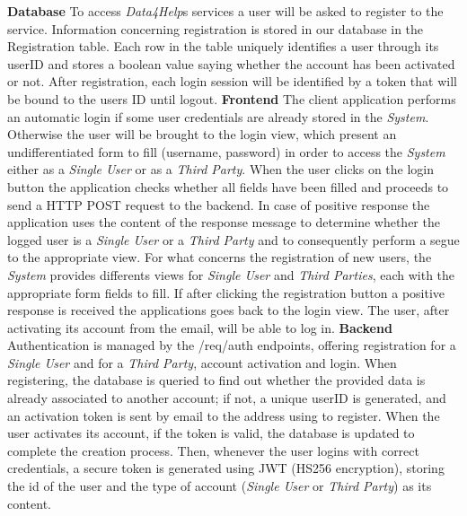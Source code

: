 \documentclass[titlepage]{article}
\begin{document}
	{\bf Database} \newline
	To access {\it Data4Help}\textsc{}s services a user will be asked to register to the service. Information concerning registration is stored in our database in the Registration table. Each row in the table uniquely identifies a user through its userID and stores a boolean value saying whether the account has been activated or not. After registration, each login session will be identified by a token that will be bound to the user\textsc{}s ID until logout.
	\newline
	\newline
	\noindent
	{\bf Frontend} \newline
	The client application performs an automatic login if some user credentials are already stored in the {\it System}. Otherwise the user will be brought to the login view, which present an undifferentiated form to fill (username, password) in order to access the {\it System} either as a {\it Single User} or as a {\it Third Party}. When the user clicks on the login button the application checks whether all fields have been filled and proceeds to send a HTTP POST request to the backend. In case of positive response the application uses the content of the response message to determine whether the logged user is a {\it Single User} or a {\it Third Party} and to consequently perform a segue to the appropriate view. For what concerns the registration of new users,  the {\it System} provides differents views for {\it Single User} and {\it Third Parties}, each with the appropriate form fields to fill. If after clicking the registration button a positive response is received the applications goes back to the login view. The user, after activating its account from the email, will be able to log in.   
	\newline
	\newline
	\noindent
	{\bf Backend} \newline
	Authentication is managed by the /req/auth endpoints, offering registration for a {\it Single User} and for a {\it Third Party}, account activation and login. 
	When registering, the database is queried to find out whether the provided data is already associated to another account; if not, a unique userID is generated, and an activation token is sent by email to the address using to register.
	When the user activates its account, if the token is valid, the database is updated to complete the creation process. Then, whenever the user logins with correct credentials, a secure token is generated using JWT (HS256 encryption), storing the id of the user and the type of account ({\it Single User} or {\it Third Party}) as its content.
	
\end{document}
